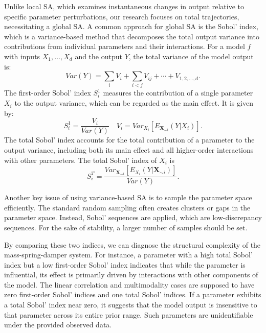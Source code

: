Unlike local \ac{SA}, which examines instantaneous changes in output relative to specific parameter perturbations, our research focuses on total trajectories, necessitating a global \ac{SA}. A common approach for global \ac{SA} is the Sobol' index, which is a variance-based method that decomposes the total output variance into contributions from individual parameters and their interactions. For a model $f$ with inputs $X_1, \ldots, X_d$ and the output $Y$, the total variance of the model output is:
\begin{equation}
    Var(Y) = \sum_i V_i + \sum_{i<j} V_{ij} + \cdots + V_{1,2,\ldots,d}.
\end{equation}
The first-order Sobol' index $S^1_i$ measures the contribution of a single parameter $X_i$ to the output variance, which can be regarded as the main effect. It is given by:
\begin{equation}
    S^1_i = \frac{V_i}{Var(Y)}\quad V_i=Var_{X_i}[E_{\boldsymbol{X}_{\sim i}}(Y|X_i)].
\end{equation}
The total Sobol' index accounts for the total contribution of a parameter to the output variance, including both its main effect and all higher-order interactions with other parameters. The total Sobol' index of $X_i$ is
\begin{equation}
    S^T_i = \frac{Var_{\boldsymbol{X}_{\sim i}}[E_{X_i}(Y|\boldsymbol{X}_{\sim i})]}{Var(Y)}.
\end{equation}

Another key issue of using variance-based \ac{SA} is to sample the parameter space efficiently. The standard random sampling often creates clusters or gaps in the parameter space. Instead, Sobol' sequences are applied, which are low-discrepancy sequences. For the sake of stability, a larger number of samples should be set.

By comparing these two indices, we can diagnose the structural complexity of the mass-spring-damper system. For instance, a parameter with a high total Sobol' index but a low first-order Sobol' index indicates that while the parameter is influential, its effect is primarily driven by interactions with other components of the model. The linear correlation and multimodality cases are supposed to have zero first-order Sobol' indices and one total Sobol' indices. 
If a parameter exhibits a total Sobol' index near zero, it suggests that the model output is insensitive to that parameter across its entire prior range. Such parameters are unidentifiable under the provided observed data. 

